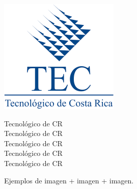 \documentclass[letterpaper, 10pt, journal]{IEEEtran}
\begin{document}
\begin{minipage}[t]{0.2\textwidth}
\includegraphics[scale=0.4]{tec-logo}
\end{minipage}
\begin{minipage}{0.2\textwidth}
Tecnol\'{o}gico de CR\\
Tecnol\'{o}gico de CR\\
Tecnol\'{o}gico de CR\\
Tecnol\'{o}gico de CR\\
Tecnol\'{o}gico de CR\\
\end{minipage}

Ejemplos de imagen + imagen + imagen.
\end{document}
